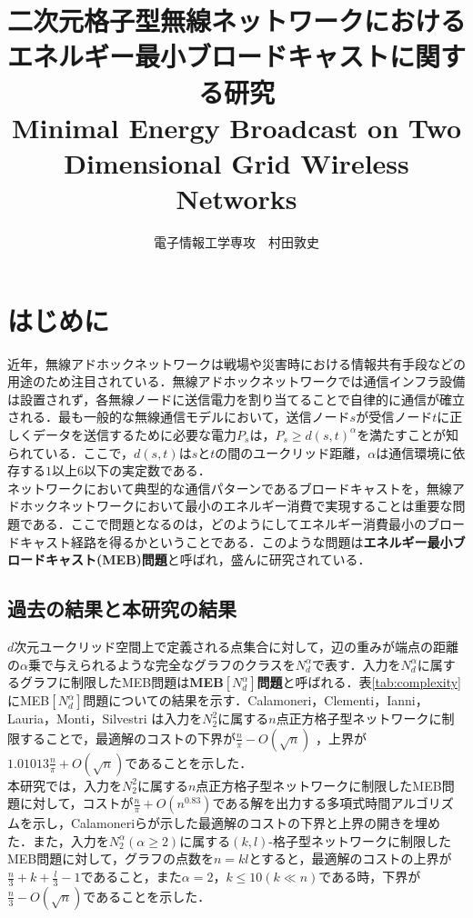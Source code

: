 \documentclass{classes/resume}
\title{
    \vspace{40pt}
    \LARGE
    二次元格子型無線ネットワークにおける\\
    エネルギー最小ブロードキャストに関する研究\\
    \Large Minimal Energy Broadcast on Two Dimensional Grid Wireless Networks
}
\author{
	\large 電子情報工学専攻　村田敦史
}
\begin{document}
\maketitle

\section{はじめに}
近年，無線アドホックネットワークは戦場や災害時における情報共有手段などの用途のため注目されている．無線アドホックネットワークでは通信インフラ設備は設置されず，各無線ノードに送信電力を割り当てることで自律的に通信が確立される．最も一般的な無線通信モデルにおいて，送信ノード$s$が受信ノード$t$に正しくデータを送信するために必要な電力$P_{s}$は，$P_{s} \ge d(s,t)^{\alpha}$を満たすことが知られている．ここで，$d(s,t)$は$s$と$t$の間のユークリッド距離，$\alpha$は通信環境に依存する$1$以上$6$以下の実定数である．\\
\indent
ネットワークにおいて典型的な通信パターンであるブロードキャストを，無線アドホックネットワークにおいて最小のエネルギー消費で実現することは重要な問題である．ここで問題となるのは，どのようにしてエネルギー消費最小のブロードキャスト経路を得るかということである．このような問題は\textbf{エネルギー最小ブロードキャスト(MEB)問題}と呼ばれ，盛んに研究されている．

\subsection{過去の結果と本研究の結果}
$d$次元ユークリッド空間上で定義される点集合に対して，辺の重みが端点の距離の$\alpha$乗で与えられるような完全なグラフのクラスを$N_{d}^{\alpha}$で表す．入力を$N_{d}^{\alpha}$に属するグラフに制限したMEB問題は\textbf{MEB$\left[N_{d}^{\alpha}\right]$問題}と呼ばれる．表\ref{tab:complexity}にMEB$\left[N_{d}^{\alpha}\right]$問題についての結果を示す．Calamoneri，Clementi，Ianni，Lauria，Monti，Silvestri \cite{ref:calamoneri2008}は入力を$N_{2}^{2}$に属する$n$点正方格子型ネットワークに制限することで，最適解のコストの下界が$\frac{n}{\pi} - O(\sqrt{n})$ ，上界が$1.01013\frac{n}{\pi} + O(\sqrt{n})$であることを示した．\\
\indent
本研究では，入力を$N_{2}^{2}$に属する$n$点正方格子型ネットワークに制限したMEB問題に対して，コストが$\frac{n}{\pi} + O(n^{0.83})$である解を出力する多項式時間アルゴリズムを示し，Calamoneriら\cite{ref:calamoneri2008}が示した最適解のコストの下界と上界の開きを埋めた．また，入力を$N_{2}^{\alpha}(\alpha \ge 2)$に属する$(k,l)$-格子型ネットワークに制限したMEB問題に対して，グラフの点数を$n = kl$とすると，最適解のコストの上界が$\frac{n}{3} + k + \frac{l}{3} - 1$であること，また$\alpha = 2$，$k \leq 10(k \ll n)$である時，下界が$\frac{n}{3} - O(\sqrt{n})$であることを示した．\\
\end{document}
